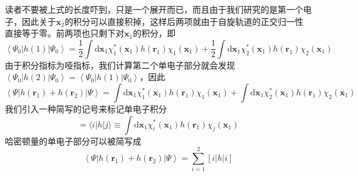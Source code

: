 \documentclass[12pt,a4paper,openany,twoside]{book}
\numberwithin{equation}{section}
\begin{document}
          读者不要被上式的长度吓到，只是一个展开而已，而且由于我们研究的是第一个电子，因此关于$\mathbf{x}_2$的积分可以直接积掉，这样后两项就由于自旋轨道的正交归一性直接等于零。前两项也只剩下对$\mathbf{x}_1$的积分，即
          \begin{equation}
            \left\langle\Psi_{0}|h(1)| \Psi_{0}\right\rangle=\frac{1}{2} \int \mathrm{d} \mathbf{x}_{1} \chi_{1}^{*}\left(\mathbf{x}_{1}\right) h\left(\mathbf{r}_{1}\right) \chi_{1}\left(\mathbf{x}_{1}\right)+\frac{1}{2} \int \mathrm{d} \mathbf{x}_{1} \chi_{2}^{*}\left(\mathbf{x}_{1}\right) h\left(\mathbf{r}_{1}\right) \chi_{2}\left(\mathbf{x}_{1}\right)
          \end{equation}
          由于积分指标为哑指标，我们计算第二个单电子部分就会发现$\left\langle\Psi_{0}|h(2)| \Psi_{0}\right\rangle=\left\langle\Psi_{0}|h(1)| \Psi_{0}\right\rangle$，因此
          \begin{equation}
            \left\langle\Psi\left|h\left(\mathbf{r}_{1}\right) + h\left(\mathbf{r}_{2}\right)\right| \Psi\right\rangle=\int \mathrm{d} \mathbf{x}_{1} \chi_{1}^{*}\left(\mathbf{x}_{1}\right) h\left(\mathbf{r}_{1}\right) \chi_{1}\left(\mathbf{x}_{1}\right)+\int \mathrm{d} \mathbf{x}_{1} \chi_{2}^{*}\left(\mathbf{x}_{1}\right) h\left(\mathbf{r}_{1}\right) \chi_{2}\left(\mathbf{x}_{1}\right)
          \end{equation}
          我们引入一种简写的记号来标记单电子积分
          \begin{equation}
            [i|h| j]=\langle i|h| j\rangle\equiv \int \mathrm{d} \mathbf{x}_{1} \chi_{i}^{*}\left(\mathbf{x}_{1}\right) h\left(\mathbf{r}_{1}\right) \chi_{j}\left(\mathbf{x}_{1}\right)
            \label{single electron integral}
          \end{equation}
          哈密顿量的单电子部分可以被简写成
          \begin{equation}
            \left\langle\Psi\left|h\left(\mathbf{r}_{1}\right) + h\left(\mathbf{r}_{2}\right)\right| \Psi\right\rangle=\sum_{i=1}^{2}[i|h|i]
          \end{equation}
\end{document}
